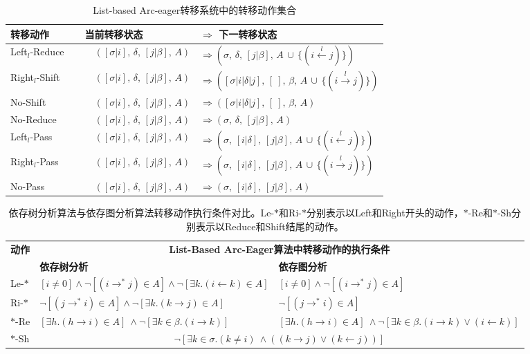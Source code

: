 \begin{table}[htbp]
	\centering
	\begin{tabular}{l|ll}
		\hline
		\bf 转移动作 \ \ \ \ & \bf 当前转移状态 & $\Rightarrow$ \bf 下一转移状态 \\
		\hline\hline
		Left$_l$-Reduce &\ \ $([\sigma|i],\,\delta,\,[j|\beta],\,A)$ & $\Rightarrow (\sigma,\,\delta,\,[j|\beta],\,A\,\cup\,\{(i\xleftarrow{l}j)\})$ \\
		Right$_l$-Shift &\ \ $([\sigma|i],\,\delta,\,[j|\beta],\,A)$ & $\Rightarrow ([\sigma|i|\delta|j],\,[\ ],\,\beta,\,A\,\cup\,\{(i\xrightarrow{l}j)\})$ \\
		No-Shift &\ \ $([\sigma|i],\,\delta,\,[j|\beta],\,A)$ & $\Rightarrow 
		([\sigma|i|\delta|j],\,[\ ],\,\beta,\,A)$ \\
		No-Reduce &\ \ $([\sigma|i],\,\delta,\,[j|\beta],\,A)$ & $\Rightarrow (\sigma,\,\delta,\,[j|\beta],\,A)$\\
		\hline
		Left$_l$-Pass &\ \ $([\sigma|i],\,\delta,\,[j|\beta],\,A)$ & $\Rightarrow (\sigma,\,[i|\delta],\,[j|\beta],\,A\,\cup\,\{(i\xleftarrow{l}j)\})$\\
		Right$_l$-Pass &\ \ $([\sigma|i],\,\delta,\,[j|\beta],\,A)$ & $\Rightarrow (\sigma,\,[i|\delta],\,[j|\beta],\,A\,\cup\,\{(i\xrightarrow{l}j)\})$\\
		No-Pass &\ \ $([\sigma|i],\,\delta,\,[j|\beta],\,A)$ & $\Rightarrow (\sigma,\,[i|\delta]	,\,[j|\beta],\,A)$\\
		\hline
	\end{tabular}
	\caption{List-based Arc-eager转移系统中的转移动作集合}
	\label{tbl:actions}
\end{table}

\begin{table}[t]
	\small
	\centering
	\begin{tabular}{l|l|l}
		\hline
		\multirow{2}{*}{\bf 动作} & \multicolumn{2}{c}{\bf List-Based Arc-Eager算法中转移动作的执行条件} \\
		\cline{2-3}
		& \bf 依存树分析 & \bf 依存图分析 \\
		\hline
		Le-$*$ & $[i\neq0] \wedge \neg[(i\rightarrow ^*j)\in A] \wedge \neg[\exists k.(i\leftarrow k)\in A] $ & $[i\neq0] \wedge \neg[(i\rightarrow ^*j)\in A] $ \\
		Ri-$*$ & $\neg[(j\rightarrow ^*i)\in A] \wedge \neg[\exists k.(k\rightarrow j)\in A] $ & $\neg[(j\rightarrow ^*i)\in A]$ \\
		$*$-Re & $[\exists h.(h\rightarrow i)\in A] \ \wedge \neg[\exists k\in\beta.(i\rightarrow k)]$ & $[\exists h.(h\rightarrow i)\in A] \ \wedge \neg[\exists k\in\beta.(i\rightarrow k)\vee(i\leftarrow k)]$ \\
		$*$-Sh & \multicolumn{2}{c}{ $\neg[\exists k\in \sigma.(k\neq i) \ \wedge ((k\rightarrow j)\vee(k\leftarrow j))]$ } \\
		\hline
	\end{tabular}
	\caption{依存树分析算法与依存图分析算法转移动作执行条件对比。Le-$*$和Ri-$*$分别表示以Left和Right开头的动作，$*$-Re和$*$-Sh分别表示以Reduce和Shift结尾的动作。}
	\label{tbl:preconditions}
\end{table}

